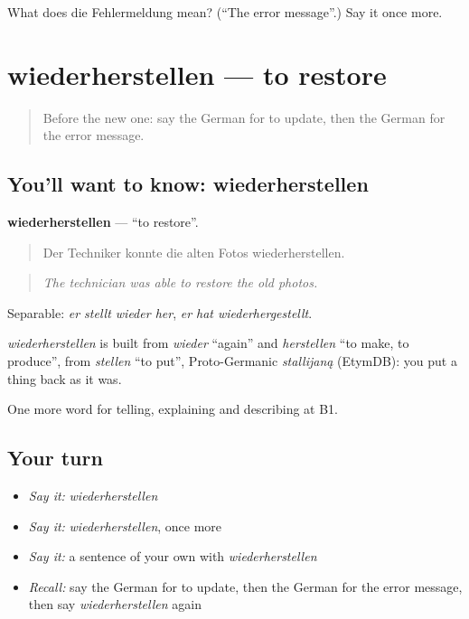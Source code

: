\begin{tcolorbox}[breakable,colback=teal!4,colframe=teal!35!black,title={Before you move on}]
What does die Fehlermeldung mean? (\textquotedblleft{}The error message\textquotedblright{}.) Say it once more.
\end{tcolorbox}
\section[wiederherstellen]{wiederherstellen — to restore}

\label{lesson:GE-C397-wiederherstellen}



\begin{quote}
Before the new one: say the German for to update, then the German for the error message.
\end{quote}

\subsection*{You'll want to know: wiederherstellen}
\textbf{wiederherstellen} — \textquotedblleft{}to restore\textquotedblright{}.

\begin{quote}
Der Techniker konnte die alten Fotos wiederherstellen.
\end{quote}

\begin{quote}
\emph{The technician was able to restore the old photos.}
\end{quote}

Separable: \emph{er stellt wieder her}, \emph{er hat wiederhergestellt}.

\begin{cousinweb}
\emph{wiederherstellen} is built from \emph{wieder} \textquotedblleft{}again\textquotedblright{} and \emph{herstellen} \textquotedblleft{}to make, to produce\textquotedblright{}, from \emph{stellen} \textquotedblleft{}to put\textquotedblright{}, Proto-Germanic \emph{stallijaną} (EtymDB): you put a thing back as it was.
\end{cousinweb}

\begin{grammarlens}[title={What you've built}]
One more word for telling, explaining and describing at B1.
\end{grammarlens}

\subsection*{Your turn}
\begin{itemize}
\raggedright
  \item \emph{Say it:} \emph{wiederherstellen}
  \item \emph{Say it:} \emph{wiederherstellen}, once more
  \item \emph{Say it:} a sentence of your own with \emph{wiederherstellen}
  \item \emph{Recall:} say the German for to update, then the German for the error message, then say \emph{wiederherstellen} again
\end{itemize}

